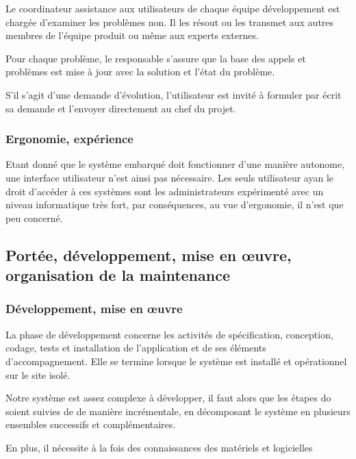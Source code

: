 		Le coordinateur assistance aux utilisateurs de chaque équipe développement est chargée d’examiner les problèmes non. Il les résout ou les transmet aux autres membres de l’équipe produit  ou même aux experts externes.
		
		Pour chaque problème, le responsable s’assure que la base des appels et problèmes est mise à jour avec la solution et l’état du problème.
		
		S’il s’agit d’une demande d’évolution, l’utilisateur est invité à formuler par écrit sa demande et l’envoyer directement au chef du projet.

		\subsubsection{Ergonomie, expérience} 
		Etant donné que le système embarqué doit fonctionner d’une manière autonome, une interface utilisateur n’est ainsi pas nécessaire. Les seuls utilisateur ayan le droit d’accéder à ces systèmes sont les administrateurs expérimenté avec un niveau informatique très fort, par conséquences, au vue d’ergonomie, il n’est que peu concerné.  

	\subsection{Portée, développement, mise en œuvre, organisation de la maintenance}
	\subsubsection{Développement, mise en œuvre} La phase de développement  concerne les activités de spécification, conception, codage, tests et installation de l’application et de ses éléments d’accompagnement. 
	Elle se termine lorsque le système est installé et opérationnel sur le site isolé.

	Notre système est assez complexe à développer, il faut alors que les étapes do soient suivies de de manière incrémentale, en décomposant le système en plusieurs ensembles successifs et complémentaires. 

	En plus, il nécessite à la fois des connaissances des matériels et logicielles

